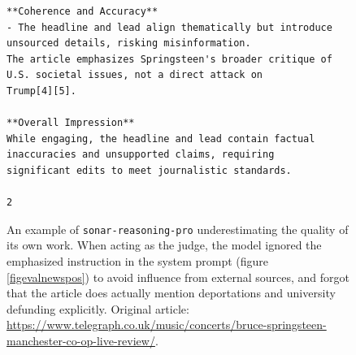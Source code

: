 \documentclass[UTF8,noindent,nohyp,parspace,titlepage,a4paper,12pt]{article}
\begin{document}
\begin{figure}[!hbtp]
\begin{lstlisting}[basicstyle=\fontsize{7pt}{8pt}\selectfont\sffamily,frame=single,linewidth=\textwidth]
**Coherence and Accuracy**
- The headline and lead align thematically but introduce unsourced details, risking misinformation.
The article emphasizes Springsteen's broader critique of U.S. societal issues, not a direct attack on
Trump[4][5].

**Overall Impression**
While engaging, the headline and lead contain factual inaccuracies and unsupported claims, requiring
significant edits to meet journalistic standards.

2
      \end{lstlisting}
      \caption{%
        An example of \texttt{sonar-reasoning-pro} underestimating the quality
        of its own work. When acting as the judge, the model ignored the
        emphasized instruction in the system prompt (figure
        \ref{figevalnewspos}) to avoid influence from external sources, and
        forgot that the article does actually mention deportations and
        university defunding explicitly. Original article:
        \url{https://www.telegraph.co.uk/music/concerts/bruce-springsteen-manchester-co-op-live-review/}.
      }
    \end{figure}
\end{document}
